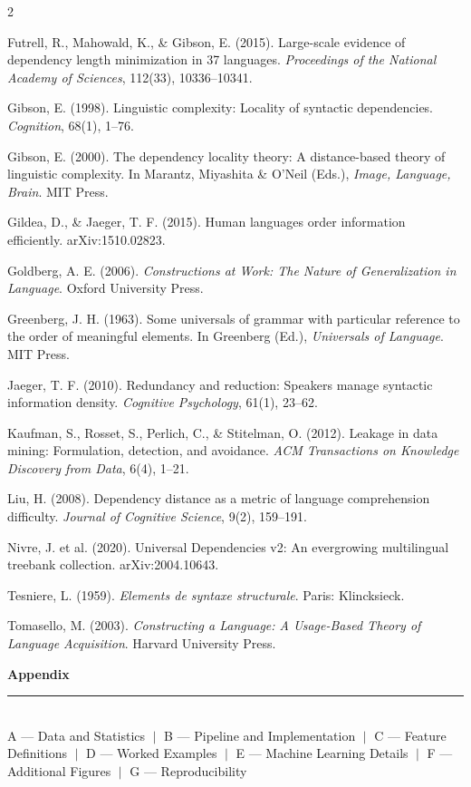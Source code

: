 \documentclass[11pt,a4paper]{article}
\begin{document}
\begin{multicols}{2}
\setlength{\columnsep}{8pt}
\begin{footnotesize}\setlength{\parskip}{1pt}
Futrell, R., Mahowald, K., \& Gibson, E. (2015). Large-scale evidence of dependency length minimization in 37 languages. \textit{Proceedings of the National Academy of Sciences}, 112(33), 10336--10341.

Gibson, E. (1998). Linguistic complexity: Locality of syntactic dependencies. \textit{Cognition}, 68(1), 1--76.

Gibson, E. (2000). The dependency locality theory: A distance-based theory of linguistic complexity. In Marantz, Miyashita \& O'Neil (Eds.), \textit{Image, Language, Brain}. MIT Press.

Gildea, D., \& Jaeger, T. F. (2015). Human languages order information efficiently. arXiv:1510.02823.

Goldberg, A. E. (2006). \textit{Constructions at Work: The Nature of Generalization in Language}. Oxford University Press.

Greenberg, J. H. (1963). Some universals of grammar with particular reference to the order of meaningful elements. In Greenberg (Ed.), \textit{Universals of Language}. MIT Press.

Jaeger, T. F. (2010). Redundancy and reduction: Speakers manage syntactic information density. \textit{Cognitive Psychology}, 61(1), 23--62.

Kaufman, S., Rosset, S., Perlich, C., \& Stitelman, O. (2012). Leakage in data mining: Formulation, detection, and avoidance. \textit{ACM Transactions on Knowledge Discovery from Data}, 6(4), 1--21.

Liu, H. (2008). Dependency distance as a metric of language comprehension difficulty. \textit{Journal of Cognitive Science}, 9(2), 159--191.

Nivre, J. et al. (2020). Universal Dependencies v2: An evergrowing multilingual treebank collection. arXiv:2004.10643.

Tesniere, L. (1959). \textit{Elements de syntaxe structurale}. Paris: Klincksieck.

Tomasello, M. (2003). \textit{Constructing a Language: A Usage-Based Theory of Language Acquisition}. Harvard University Press.
\end{footnotesize}
\end{multicols}

\newpage
\begin{center}
{\Large\textbf{Appendix}}\\[4pt]
\rule{\linewidth}{0.5pt}\\[4pt]
{\small A --- Data and Statistics $\;\vert\;$ B --- Pipeline and Implementation $\;\vert\;$ C --- Feature Definitions $\;\vert\;$ D --- Worked Examples $\;\vert\;$ E --- Machine Learning Details $\;\vert\;$ F --- Additional Figures $\;\vert\;$ G --- Reproducibility}
\end{center}
\vspace{6pt}
\end{document}
